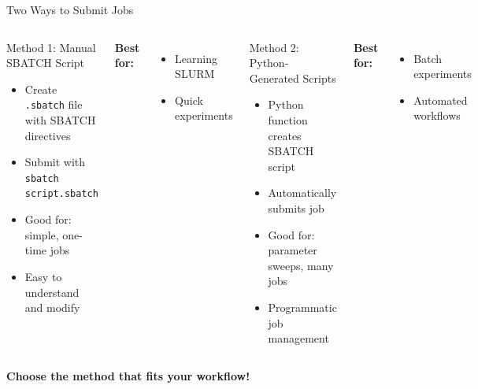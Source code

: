 \documentclass[aspectratio=169]{beamer}
\begin{document}
\begin{frame}{Two Ways to Submit Jobs}
\begin{columns}[T]
\begin{block}{Method 1: Manual SBATCH Script}
\begin{itemize}
    \item Create \texttt{.sbatch} file with SBATCH directives
    \item Submit with \texttt{sbatch script.sbatch}
    \item Good for: simple, one-time jobs
    \item Easy to understand and modify
\end{itemize}
\end{block}

\vspace{0.2em}
\textbf{Best for:}
\begin{itemize}
    \item Learning SLURM
    \item Quick experiments
\end{itemize}

\begin{block}{Method 2: Python-Generated Scripts}
\begin{itemize}
    \item Python function creates SBATCH script
    \item Automatically submits job
    \item Good for: parameter sweeps, many jobs
    \item Programmatic job management
\end{itemize}
\end{block}

\vspace{0.2em}
\textbf{Best for:}
\begin{itemize}
    \item Batch experiments
    \item Automated workflows
\end{itemize}
\end{columns}

\vspace{0.2em}
\centering
\textcolor{ceciblue}{\textbf{Choose the method that fits your workflow!}}
\end{frame}
\end{document}

